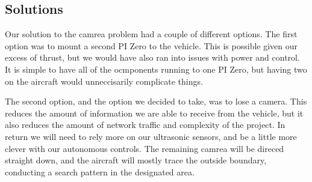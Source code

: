 \documentclass[onecolumn, draftclsnofoot,10pt, compsoc]{IEEEtran}
\begin{document}
\subsection{Solutions}

Our solution to the camrea problem had a couple of different options. The first option was to mount a second PI Zero to the vehicle. This is possible given our excess of thrust, but we would have also ran into issues with power and control. It is simple to have all of the ocmponents running to one PI Zero, but having two on the aircraft would unneccisarily complicate things. 

The second option, and the option we decided to take, was to lose a camera. This reduces the amount of information we are able to receive from the vehicle, but it also reduces the amount of network traffic and complexity of the project. In return we will need to rely more on our ultrasonic sensors, and be a little more clever with our autonomous controls. The remaining camrea will be direced straight down, and the aircraft will mostly trace the outside boundary, conducting a search pattern in the designated area.


\newpage
\end{document}
